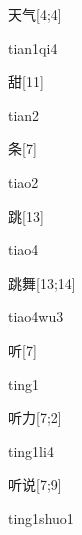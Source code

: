 \begin{verbete}[tian1qi4]{天气}[4;4]
\begin{pronuncia}{tian1qi4}
\end{pronuncia}
\end{verbete}

\begin{verbete}[tian2]{甜}[11]
\begin{pronuncia}{tian2}
\end{pronuncia}
\end{verbete}

\begin{verbete}[tiao2]{条}[7]
\begin{pronuncia}{tiao2}
\end{pronuncia}
\end{verbete}

\begin{verbete}[tiao4]{跳}[13]
\begin{pronuncia}{tiao4}
\end{pronuncia}
\end{verbete}

\begin{verbete}[tiao4wu3]{跳舞}[13;14]
\begin{pronuncia}{tiao4wu3}
\end{pronuncia}
\end{verbete}

\begin{verbete}[ting1]{听}[7]
\begin{pronuncia}{ting1}
\end{pronuncia}
\end{verbete}

\begin{verbete}[ting1li4]{听力}[7;2]
\begin{pronuncia}{ting1li4}
\end{pronuncia}
\end{verbete}

\begin{verbete}{听说}[7;9]
\begin{pronuncia}{ting1shuo1}
\end{pronuncia}
\end{verbete}

